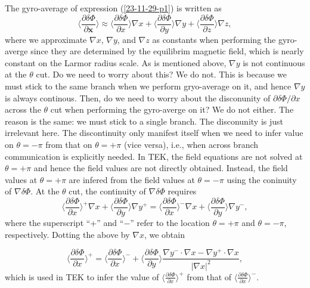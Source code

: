 \documentclass{article}
\begin{document}
The gyro-average of expression (\ref{23-11-29-p1}) is written as
\begin{equation}
  \langle \frac{\partial \delta \Phi}{\partial \mathbf{x}} \rangle \approx
  \langle \frac{\partial \delta \Phi}{\partial x} \rangle \nabla x + \langle
  \frac{\partial \delta \Phi}{\partial y} \rangle \nabla y + \langle
  \frac{\partial \delta \Phi}{\partial z} \rangle \nabla z,
\end{equation}
where we approximate $\nabla x$, $\nabla y$, and $\nabla z$ as constants when
performing the gyro-averge since they are determined by the equilibrim
magnetic field, which is nearly constant on the Larmor radius scale. As is
mentioned above, $\nabla y$ is not continuous at the $\theta$ cut. Do we need
to worry about this? We do not. This is because we must stick to the same
branch when we perform gryo-average on it, and hence $\nabla y$ is always
continous. Then, do we need to worry about the disconunity of $\partial \delta
\Phi / \partial x$ across the $\theta$ cut when performing the gyro-averge on
it? We do not either. The reason is the same: we must stick to a single
branch. The disconunity is just irrelevant here. The discontinuity only
manifest itself when we need to infer value on $\theta = - \pi$ from that on
$\theta = + \pi$ (vice versa), i.e., when across branch communication is
explicitly needed. In TEK, the field equations are not solved at $\theta = +
\pi$ and hence the field values are not directly obtained. Instead, the field
values at $\theta = + \pi$ are infered from the field values at $\theta = -
\pi$ using the coninuity of $\nabla \delta \Phi$. At the $\theta$ cut, the
continuity of $\nabla \delta \Phi$ requires
\begin{equation}
  \langle \frac{\partial \delta \Phi}{\partial x} \rangle^+ \nabla x + \langle
  \frac{\partial \delta \Phi}{\partial y} \rangle \nabla y^+ = \langle
  \frac{\partial \delta \Phi}{\partial x} \rangle^- \nabla x + \langle
  \frac{\partial \delta \Phi}{\partial y} \rangle \nabla y^-,
\end{equation}
where the superscript ``+'' and ``$-$'' refer to the location $\theta = + \pi$
and $\theta = - \pi$, respectively. Dotting the above by $\nabla x$, we obtain


\begin{equation}
  \langle \frac{\partial \delta \Phi}{\partial x} \rangle^+ = \langle
  \frac{\partial \delta \Phi}{\partial x} \rangle^- + \langle \frac{\partial
  \delta \Phi}{\partial y} \rangle \frac{\nabla y^- \cdot \nabla x - \nabla
  y^+ \cdot \nabla x}{| \nabla x |^2},
\end{equation}
which is used in TEK to infer the value of $\langle \frac{\partial \delta
\Phi}{\partial x} \rangle^+$ from that of $\langle \frac{\partial \delta
\Phi}{\partial x} \rangle^-$.
\end{document}
